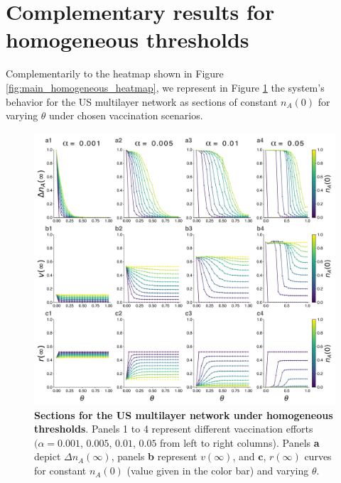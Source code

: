 \documentclass[
 reprint,
 amsmath,amssymb,
 aps,
]{revtex4-2}
\begin{document}
\section{Complementary results for homogeneous thresholds}
\label{app:sections}

\setcounter{figure}{0}


Complementarily to the heatmap shown in Figure \ref{fig:main_homogeneous_heatmap}, we represent in Figure \ref{fig:supp_sections} the system's behavior for the US multilayer network as sections of constant $n_A(0)$ for varying $\theta$ under chosen vaccination scenarios.

\begin{figure}
\centering
\includegraphics[width=\textwidth]{figure7.pdf}
\caption{\label{fig:supp_sections} \textbf{Sections for the US multilayer network under homogeneous thresholds}. Panels 1 to 4 represent different vaccination efforts $(\alpha=0.001$, $0.005$, $0.01$, $0.05$ from left to right columns). Panels \textbf{a} depict $\Delta n_A(\infty)$, panels \textbf{b} represent $v(\infty)$, and $\textbf{c}$, $r(\infty)$ curves for constant $n_A(0)$ (value given in the color bar) and varying $\theta$.}
\end{figure}
\end{document}
